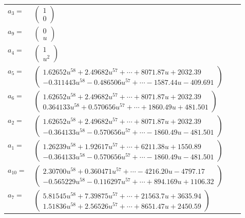 \documentclass[1p]{elsarticle_modified}
\theoremstyle{definition}
\begin{document}
\begin{tabular}{m{7pt} m{180pt} m{7pt} m{180pt} }
\flushright $a_{3}=$&$\begin{pmatrix}1\\0\end{pmatrix}$ \\
\flushright $a_{9}=$&$\begin{pmatrix}0\\u\end{pmatrix}$ \\
\flushright $a_{4}=$&$\begin{pmatrix}1\\u^2\end{pmatrix}$ \\
\flushright $a_{5}=$&$\begin{pmatrix}1.62652 u^{58}+2.49682 u^{57}+\cdots+8071.87 u+2032.39\\-0.311443 u^{58}-0.486506 u^{57}+\cdots-1587.44 u-409.691\end{pmatrix}$ \\
\flushright $a_{6}=$&$\begin{pmatrix}1.62652 u^{58}+2.49682 u^{57}+\cdots+8071.87 u+2032.39\\0.364133 u^{58}+0.570656 u^{57}+\cdots+1860.49 u+481.501\end{pmatrix}$ \\
\flushright $a_{2}=$&$\begin{pmatrix}1.62652 u^{58}+2.49682 u^{57}+\cdots+8071.87 u+2032.39\\-0.364133 u^{58}-0.570656 u^{57}+\cdots-1860.49 u-481.501\end{pmatrix}$ \\
\flushright $a_{1}=$&$\begin{pmatrix}1.26239 u^{58}+1.92617 u^{57}+\cdots+6211.38 u+1550.89\\-0.364133 u^{58}-0.570656 u^{57}+\cdots-1860.49 u-481.501\end{pmatrix}$ \\
\flushright $a_{10}=$&$\begin{pmatrix}2.30700 u^{58}+0.360471 u^{57}+\cdots-4216.20 u-4797.17\\-0.565229 u^{58}-0.116297 u^{57}+\cdots+894.169 u+1106.32\end{pmatrix}$ \\
\flushright $a_{7}=$&$\begin{pmatrix}5.81545 u^{58}+7.39875 u^{57}+\cdots+21563.7 u+3635.94\\1.51836 u^{58}+2.56526 u^{57}+\cdots+8651.47 u+2450.59\end{pmatrix}$ \\

\end{tabular}
\end{document}
